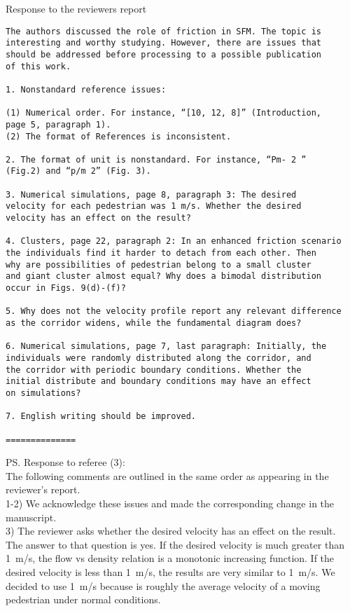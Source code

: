 \documentclass[a4paper,12pt]{letter}
\begin{document}
\begin{letter}{Response to the reviewers report}
\begin{verbatim}
The authors discussed the role of friction in SFM. The topic is 
interesting and worthy studying. However, there are issues that 
should be addressed before processing to a possible publication 
of this work.

1. Nonstandard reference issues:

(1) Numerical order. For instance, “[10, 12, 8]” (Introduction,
page 5, paragraph 1).
(2) The format of References is inconsistent.

2. The format of unit is nonstandard. For instance, “Pm- 2 ” 
(Fig.2) and “p/m 2” (Fig. 3).

3. Numerical simulations, page 8, paragraph 3: The desired 
velocity for each pedestrian was 1 m/s. Whether the desired 
velocity has an effect on the result?

4. Clusters, page 22, paragraph 2: In an enhanced friction scenario 
the individuals find it harder to detach from each other. Then 
why are possibilities of pedestrian belong to a small cluster 
and giant cluster almost equal? Why does a bimodal distribution 
occur in Figs. 9(d)-(f)?

5. Why does not the velocity profile report any relevant difference 
as the corridor widens, while the fundamental diagram does?

6. Numerical simulations, page 7, last paragraph: Initially, the 
individuals were randomly distributed along the corridor, and 
the corridor with periodic boundary conditions. Whether the 
initial distribute and boundary conditions may have an effect 
on simulations?

7. English writing should be improved.

==============

\end{verbatim}


\ps{Response to referee (3): \\

The following comments are outlined in the same order as appearing in the
reviewer’s report. \\

1-2) We acknowledge these issues and made the corresponding change in the 
manuscript.\\

3) The reviewer asks whether the desired velocity has an effect on the result.\\

The answer to that question is yes. If the desired velocity is much greater than 1~m/s, the flow vs density relation is a monotonic increasing function. If the desired velocity is less than 1~m/s, the results are very similar to 1~m/s. We decided to use 1~m/s because is roughly the average velocity of a moving pedestrian under normal conditions. \\

}
\end{letter}
\end{document}
